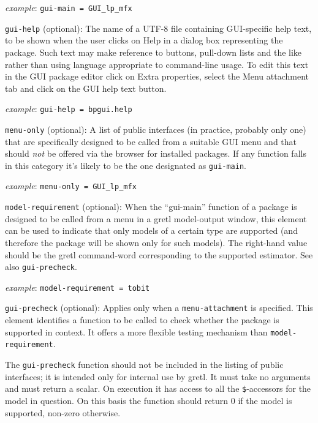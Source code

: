 \documentclass[oneside]{book}
\newcommand{\ttusage}[1]{\textit{example}: \quad \texttt{#1}}
\newcommand{\vbusage}[0]{\textit{example}: \quad}
\begin{document}
\begin{description}
  \vbusage{} \verb|gui-main = GUI_lp_mfx|

\item \texttt{gui-help} (optional): The name of a UTF-8 file
  containing GUI-specific help text, to be shown when the user clicks
  on \textsf{Help} in a dialog box representing the package. Such text
  may make reference to buttons, pull-down lists and the like rather
  than using language appropriate to command-line usage. To edit this
  text in the GUI package editor click on \textsf{Extra properties},
  select the \textsf{Menu attachment} tab and click on the \textsf{GUI
    help text} button.

  \ttusage{gui-help = bpgui.help}

\item \texttt{menu-only} (optional): A list of public interfaces (in
  practice, probably only one) that are specifically designed to be
  called from a suitable GUI menu and that should \textit{not} be
  offered via the browser for installed packages. If any function
  falls in this category it's likely to be the one designated as
  \texttt{gui-main}.

  \vbusage{} \verb|menu-only = GUI_lp_mfx|

\item \texttt{model-requirement} (optional): When the ``gui-main''
  function of a package is designed to be called from a menu in a
  gretl model-output window, this element can be used to indicate that
  only models of a certain type are supported (and therefore the
  package will be shown only for such models).  The right-hand value
  should be the gretl command-word corresponding to the supported
  estimator. See also \texttt{gui-precheck}.

  \ttusage{model-requirement = tobit}

\item \texttt{gui-precheck} (optional): Applies only when a
  \texttt{menu-attachment} is specified. This element identifies a
  function to be called to check whether the package is supported in
  context.  It offers a more flexible testing mechanism than
  \texttt{model-requirement}.

  The \texttt{gui-precheck} function should not be included in the
  listing of public interfaces; it is intended only for internal use
  by gretl. It must take no arguments and must return a scalar. On
  execution it has access to all the \texttt{\$}-accessors for the
  model in question. On this basis the function should return 0 if the
  model is supported, non-zero otherwise.


\end{description}
\end{document}
